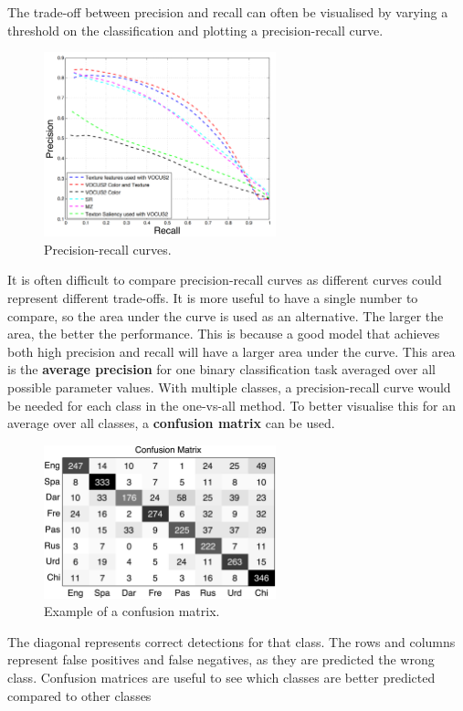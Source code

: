 \documentclass[CS5104-Notes.tex]{subfiles}
\begin{document}
\n
The trade-off between precision and recall can often be visualised by varying a threshold on the classification and plotting a precision-recall curve. 
\begin{figure}[H]
\centering
\includegraphics[width=0.6\textwidth, keepaspectratio]{imgs/precision-recall.png}
\caption{Precision-recall curves.}
\end{figure}
\noindent
It is often difficult to compare precision-recall curves as different curves could represent different trade-offs. It is more useful to have a single number to compare, so the area under the curve is used as an alternative. The larger the area, the better the performance. This is because a good model that achieves both high precision and recall will have a larger area under the curve. This area is the \textbf{average precision} for one binary classification task averaged over all possible parameter values. With multiple classes, a precision-recall curve would be needed for each class in the one-vs-all method. To better visualise this for an average over all classes, a \textbf{confusion matrix} can be used.
\begin{figure}[H]
\centering
\includegraphics[width=0.6\textwidth, keepaspectratio]{imgs/confusion-matrix.png}
\caption{Example of a confusion matrix.}
\end{figure}
\noindent
The diagonal represents correct detections for that class. The rows and columns represent false positives and false negatives, as they are predicted the wrong class. Confusion matrices are useful to see which classes are better predicted compared to other classes
\end{document}
